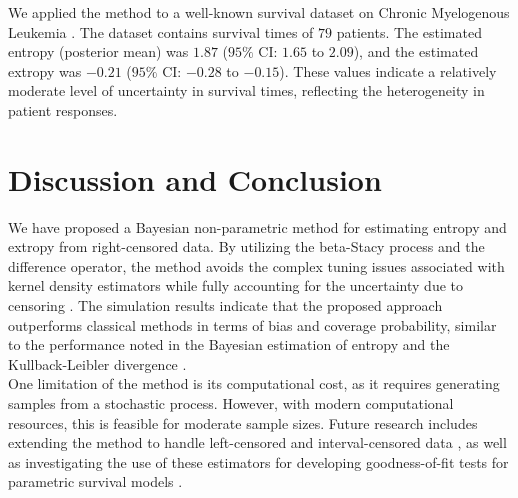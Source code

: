 \documentclass[twoside]{article}
\begin{document}
\begin{eg}
\label{eg2}
We applied the method to a well-known survival dataset on Chronic Myelogenous Leukemia 
\citep{8}. 
The dataset contains survival times of 
$79$ 
patients. 
The estimated entropy (posterior mean) was 
$1.87$ 
($95\%$ CI: $1.65$ to $2.09$), 
and the estimated extropy was 
$-0.21$ 
($95\%$ CI: $-0.28$ to $-0.15$). 
These values indicate a relatively moderate level of uncertainty in survival times, reflecting the heterogeneity in patient responses. 
\end{eg}

\section{Discussion and Conclusion}
We have proposed a Bayesian non-parametric method for estimating entropy and extropy from right-censored data. 
By utilizing the beta-Stacy process and the difference operator, the method avoids the complex tuning issues associated with kernel density estimators while fully accounting for the uncertainty due to censoring
\citep{9}. 
The simulation results indicate that the proposed approach outperforms classical methods in terms of bias and coverage probability, similar to the performance noted in the Bayesian estimation of entropy
\citep{2}
and the Kullback-Leibler divergence
\citep{4}. 
\\
One limitation of the method is its computational cost, as it requires generating samples from a stochastic process. 
However, with modern computational resources, this is feasible for moderate sample sizes. 
Future research includes extending the method to handle left-censored and interval-censored data 
\citep{8}, 
as well as investigating the use of these estimators for developing goodness-of-fit tests for parametric survival models 
\citep{1,3}. 

\end{document}

